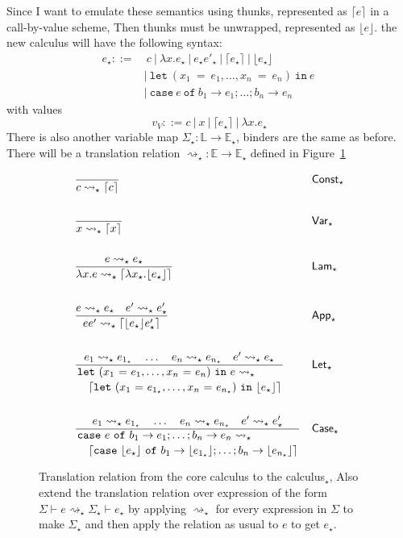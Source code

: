 \documentclass[float=false, crop=false]{standalone}
\numberwithin{subcase}{case}
\newcommand{\tlang}{\star}
\newcommand{\thunk}[1]{\lceil #1 \rceil}
\newcommand{\unwrap}[1]{\lfloor #1 \rfloor}
\newcommand{\tlthunk}{\rightsquigarrow_\tlang}
\begin{document}
Since I want to emulate these semantics using thunks, represented as $\thunk{e}$ in a call-by-value scheme, 
Then thunks must be unwrapped, represented as $\unwrap{e}$. 
the new calculus will have the following syntax:
\begin{align*} 
  e_\tlang ::=&\ c\ |\ \lambda x.e_\tlang\ |\ e_\tlang e'_\tlang\ |\ \thunk{e_\tlang}\ |\ \unwrap{e_\tlang}
  \\ &|\ \mathtt{let}\ (x_1\ \mathtt{=}\ e_1,\dotsc, x_n\ \mathtt{=}\ e_n)\ \mathtt{in}\ e\
  \\ &|\ \mathtt{case}\ e\ \mathtt{of}\ b_1 \rightarrow e_1; \dots; b_n \rightarrow e_n
\end{align*}
with values 
\[ v_V ::= c\ |\ x\ |\ \thunk{e_\tlang}\ |\ \lambda x. e_\tlang \]
There is also another variable map $\Sigma_\tlang : \mathbb{L} \rightarrow \mathbb{E}_\tlang$, 
binders are the same as before.
There will be a translation relation $\tlthunk: \mathbb{E} \rightarrow \mathbb{E}_\tlang$
defined in Figure~\ref{t:translation}

\begin{figure}
\begin{align*}
  &\frac{}{c \tlthunk \thunk{c}} && \mathsf{Const}_\tlang\\ \\
  &\frac{}{x \tlthunk \thunk{x}} && \mathsf{Var}_\tlang\\ \\
  &\frac{e \tlthunk e_\tlang}
     {\lambda x . e \tlthunk \thunk{\lambda x_\tlang.\unwrap{e_\tlang}}}
       && \mathsf{Lam}_\tlang\\ \\
  &\frac{e  \tlthunk e_\tlang \quad e' \tlthunk e'_\tlang}
  {e e' \tlthunk \thunk{\unwrap{e_\tlang} e'_\tlang}} && \mathsf{App}_\tlang\\\\
  &\dfrac{e_1  \tlthunk e_{1_\tlang} \quad \dots \quad e_n \tlthunk e_{n_\tlang} \quad e' \tlthunk e_\tlang}
  {\splitdfrac{\mathtt{let}\ (x_1\ \mathtt{=}\ e_1,\dotsc, x_n\ \mathtt{=}\ e_n)\ \mathtt{in}\ e \tlthunk}
    {\thunk{\mathtt{let}\ 
        (x_1\ \mathtt{=}\ e_{1_\tlang},\dotsc, x_n\ \mathtt{=}\ e_{n_\tlang}) \ \mathtt{in}\ \unwrap{e_\tlang}}}} && \mathsf{Let}_\tlang\\ \\
  &\dfrac{e_1  \tlthunk e_{1_\tlang} \quad \dots \quad e_n \tlthunk e_{n_\tlang} \quad e' \tlthunk e'_\tlang}
  {\splitdfrac{\mathtt{case}\ e\ \mathtt{of}\ b_1 \rightarrow e_1; \dots; b_n \rightarrow e_n \tlthunk}
  {\thunk{\mathtt{case}\ \unwrap{e_\tlang}\ \mathtt{of}\ b_1 \rightarrow \unwrap{e_{1_\tlang}}; 
      \dots; b_n \rightarrow \unwrap{e_{n_\tlang}}}}} && \mathsf{Case}_\tlang
\end{align*}
\caption[Definition of translation relation from the core calculus to  calculus$_\tlang$]{Translation relation from the core calculus to the calculus$_\tlang$, Also
extend the translation relation over expression of the form $\Sigma \vdash e \tlthunk \Sigma_\tlang 
\vdash e_\tlang$ by applying $\tlthunk$ for every expression in $\Sigma$ to make $\Sigma_\tlang$ and
then apply the relation as usual to $e$ to get $e_\tlang$.}
\label{t:translation}
\end{figure}
\end{document}
